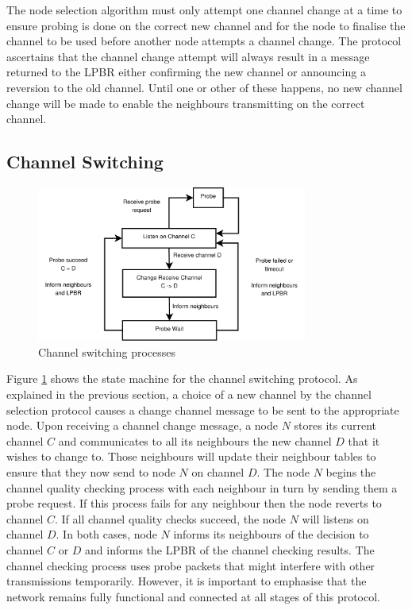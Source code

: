 The node selection algorithm must only attempt one channel change at a time to ensure probing is done on the correct new channel and for the node to finalise the channel to be used before another node attempts a channel change.
The protocol ascertains that the channel change attempt will always result in a message returned to the LPBR either confirming the new channel or announcing a reversion to the old channel. Until one or other of these happens, no new channel change will be made to enable the neighbours transmitting on the correct channel.

\subsection{Channel Switching}
\label{sec:channelswitch}

\begin{figure}
\centering
\includegraphics[width=3.5in]{Diagram1.pdf}
\caption{Channel switching processes}
\label{fig_sim}
\end{figure}

Figure \ref{fig_sim} shows the state machine for the channel switching protocol.
As explained in the previous section, a choice of a new channel by the channel selection protocol causes a change channel message to be sent to the appropriate node. 
Upon receiving a channel change message, a node $N$ stores its current channel $C$ and communicates to all its neighbours the new channel $D$ that it wishes to change to. Those neighbours will update their neighbour tables to ensure that they now send to node $N$ on channel $D$.  The node $N$ begins the channel quality checking process with each neighbour in turn by sending them a probe request. If this process fails for any neighbour then the node reverts to channel $C$. If all channel quality checks succeed, the node $N$ will listens on channel $D$. In both cases, node $N$ informs its neighbours of the decision to channel $C$ or $D$ and informs the LPBR of the channel checking results. The channel checking process uses probe packets that might interfere with other transmissions temporarily. However, it is important to emphasise that the network remains fully functional and connected at all stages of this protocol.


